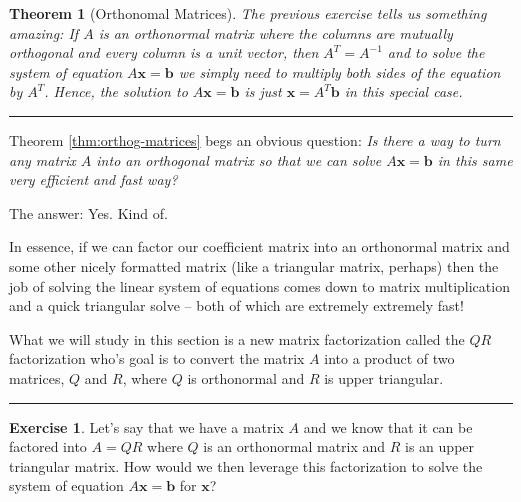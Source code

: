 \documentclass[
]{book}
\newtheorem{theorem}{Theorem}[chapter]
\theoremstyle{definition}
\theoremstyle{definition}
\theoremstyle{definition}
\newtheorem{exercise}{Exercise}[chapter]
\theoremstyle{remark}
\begin{document}
\begin{theorem}[Orthonomal Matrices]
\protect\hypertarget{thm:orthog-matrices}{}{\label{thm:orthog-matrices} {} }The previous exercise tells us something amazing: If \(A\) is an orthonormal matrix where the columns are mutually orthogonal and every column is a unit vector, then \(A^T = A^{-1}\) and to solve the system of equation \(A\boldsymbol{x} = \boldsymbol{b}\) we simply need to multiply both sides of the equation by \(A^T\). Hence, the solution to \(A \boldsymbol{x} = \boldsymbol{b}\) is just \(\boldsymbol{x} = A^T \boldsymbol{b}\) in this special case.
\end{theorem}

\begin{center}\rule{0.5\linewidth}{0.5pt}\end{center}

Theorem \ref{thm:orthog-matrices} begs an obvious question: \emph{Is there a way to turn any matrix \(A\) into an orthogonal matrix so that we can solve \(A \boldsymbol{x} = \boldsymbol{b}\) in this same very efficient and fast way?}

The answer: Yes. Kind of.

In essence, if we can factor our coefficient matrix into an orthonormal matrix and some other nicely formatted matrix (like a triangular matrix, perhaps) then the job of solving the linear system of equations comes down to matrix multiplication and a quick triangular solve -- both of which are extremely extremely fast!

What we will study in this section is a new matrix factorization called the \(QR\) factorization who's goal is to convert the matrix \(A\) into a product of two matrices, \(Q\) and \(R\), where \(Q\) is orthonormal and \(R\) is upper triangular.

\begin{center}\rule{0.5\linewidth}{0.5pt}\end{center}

\begin{exercise}
\protect\hypertarget{exr:unnamed-chunk-340}{}{\label{exr:unnamed-chunk-340} }Let's say that we have a matrix \(A\) and we know that it can be factored into \(A = QR\) where \(Q\) is an orthonormal matrix and \(R\) is an upper triangular matrix. How would we then leverage this factorization to solve the system of equation \(A \boldsymbol{x} = \boldsymbol{b}\) for \(\boldsymbol{x}\)?
\end{exercise}
\end{document}

